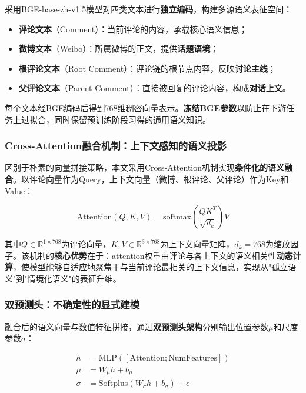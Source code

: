 \documentclass[10pt]{article}
\begin{document}
采用BGE-base-zh-v1.5模型对四类文本进行\textbf{独立编码}，构建多源语义表征空间：

\begin{itemize}[leftmargin=*]
    \item \textbf{评论文本}（Comment）：当前评论的内容，承载核心语义信息；
    \item \textbf{微博文本}（Weibo）：所属微博的正文，提供\textbf{话题语境}；
    \item \textbf{根评论文本}（Root Comment）：评论链的根节点内容，反映\textbf{讨论主线}；
    \item \textbf{父评论文本}（Parent Comment）：直接被回复的评论内容，构成\textbf{对话上文}。
\end{itemize}

每个文本经BGE编码后得到768维稠密向量表示。\textbf{冻结BGE参数}以防止在下游任务上过拟合，同时保留预训练阶段习得的通用语义知识。

\subsubsection{Cross-Attention融合机制：上下文感知的语义投影}

区别于朴素的向量拼接策略，本文采用Cross-Attention机制实现\textbf{条件化的语义融合}。以评论向量作为Query，上下文向量（微博、根评论、父评论）作为Key和Value：

\begin{equation}
\text{Attention}(Q, K, V) = \text{softmax}\left(\frac{QK^T}{\sqrt{d_k}}\right)V
\end{equation}

其中$Q \in \mathbb{R}^{1 \times 768}$为评论向量，$K, V \in \mathbb{R}^{3 \times 768}$为上下文向量矩阵，$d_k = 768$为缩放因子。该机制的\textbf{核心优势}在于：attention权重由评论与各上下文的语义相关性\textbf{动态计算}，使模型能够自适应地聚焦于与当前评论最相关的上下文信息，实现从"孤立语义"到"情境化语义"的表征升维。

\subsubsection{双预测头：不确定性的显式建模}

融合后的语义向量与数值特征拼接，通过\textbf{双预测头架构}分别输出位置参数$\mu$和尺度参数$\sigma$：

\begin{align}
h &= \text{MLP}([\text{Attention}; \text{NumFeatures}]) \\
\mu &= W_\mu h + b_\mu \\
\sigma &= \text{Softplus}(W_\sigma h + b_\sigma) + \epsilon
\end{align}
\end{document}
